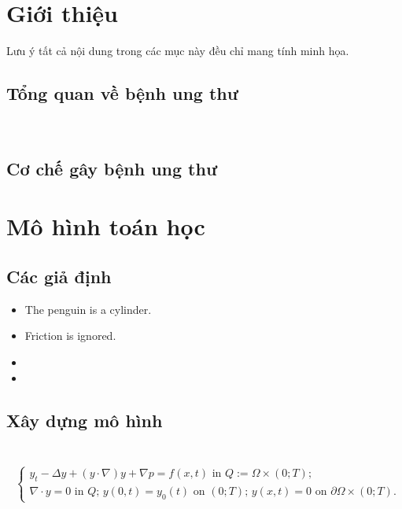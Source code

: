 \section{Giới thiệu}
Lưu ý tất cả nội dung trong các mục này đều chỉ mang tính minh họa. \lipsum[4][1-3]
\subsection{Tổng quan về bệnh ung thư}
\lipsum[1]\\
\lipsum[2]
\subsection{Cơ chế gây bệnh ung thư}
\lipsum[3]
\section{Mô hình toán học}
\subsection{Các giả định}
\lipsum[2]
\begin{itemize}
    \item The penguin is a cylinder. \lipsum[9][1-3]

    \item Friction is ignored. \lipsum[3][1-3]

    \item \lipsum[4][1-3]

    \item \lipsum[5][1-3]
\end{itemize}

\subsection{Xây dựng mô hình}

\lipsum[3][1-8]\\
\begin{align}\label{equation_1}
    \begin{split}
        \begin{cases}
            y_t - \Delta y + (y \cdot\nabla)y + \nabla p = f(x,t) \text{ in }Q:=\Omega \times (0;T);\\
            \nabla \cdot y = 0 \text{ in }Q; \,y(0,t)=y_0(t) \text{ on }(0;T); \, y(x,t) = 0 \text{ on }\partial\Omega \times (0;T).
        \end{cases}
    \end{split}
\end{align}

